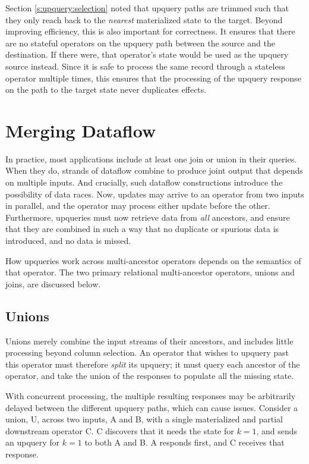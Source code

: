 Section \ref{s:upquery:selection} noted that upquery paths are trimmed such that
they only reach back to the \emph{nearest} materialized state to the target.
Beyond improving efficiency, this is also important for correctness. It ensures
that there are no stateful operators on the upquery path between the source and
the destination. If there were, that operator's state would be used as the
upquery source instead. Since it is safe to process the same record through a
stateless operator multiple times, this ensures that the processing of the
upquery response on the path to the target state never duplicates effects.

\section{Merging Dataflow}

In practice, most applications include at least one join or union in their
queries. When they do, strands of dataflow combine to produce joint output that
depends on multiple inputs. And crucially, such dataflow constructions introduce
the possibility of data races. Now, updates may arrive to an operator from two
inputs in parallel, and the operator may process either update before the other.
Furthermore, upqueries must now retrieve data from \emph{all} ancestors, and
ensure that they are combined in such a way that no duplicate or spurious data
is introduced, and no data is missed.

How upqueries work across multi-ancestor operators depends on the semantics of
that operator. The two primary relational multi-ancestor operators, unions and
joins, are discussed below.

\subsection{Unions}
\label{s:upqueries:union}

Unions merely combine the input streams of their ancestors, and includes little
processing beyond column selection. An operator that wishes to upquery past this
operator must therefore \emph{split} its upquery; it must query each ancestor of
the operator, and take the union of the responses to populate all the missing
state.

With concurrent processing, the multiple resulting responses may be arbitrarily
delayed between the different upquery paths, which can cause issues. Consider
a union, U, across two inputs, A and B, with a single materialized and partial
downstream operator C. C discovers that it needs the state for $k = 1$, and
sends an upquery for $k = 1$ to both A and B. A responds first, and C receives
that response.

